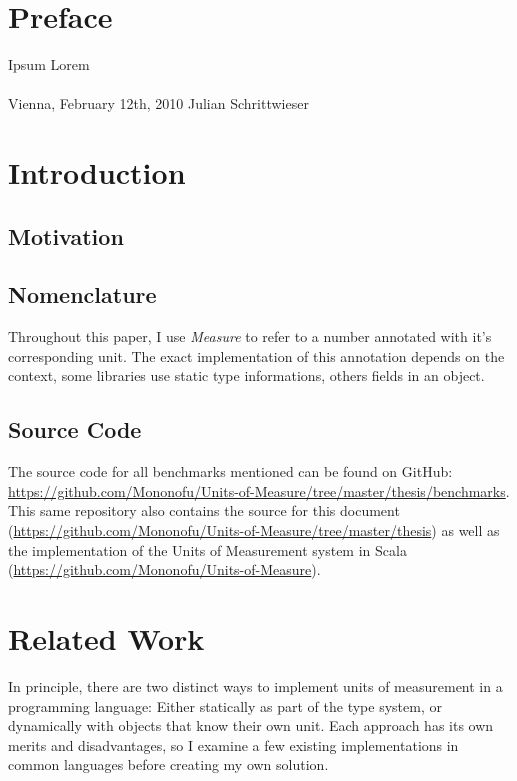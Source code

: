 \documentclass[12pt,oneside,a4paper]{scrbook}
\theoremstyle{definition}
\begin{document}
\chapter*{Preface}

Ipsum Lorem
\\ \\
Vienna, February 12th, 2010  \hfill Julian Schrittwieser

\singlespacing
\tableofcontents

\chapter{Introduction}
\setcounter{page}{1}
\section{Motivation}

\section{Nomenclature}
Throughout this paper, I use \emph{Measure} to refer to a number annotated with it's corresponding unit. The exact implementation of this annotation depends on the context, some libraries use static type informations, others fields in an object.

\section{Source Code}
The source code for all benchmarks mentioned can be found on GitHub: \url{https://github.com/Mononofu/Units-of-Measure/tree/master/thesis/benchmarks}. This same repository also contains the source for this document (\url{https://github.com/Mononofu/Units-of-Measure/tree/master/thesis}) as well as the implementation of the Units of Measurement system in Scala (\url{https://github.com/Mononofu/Units-of-Measure}).

\chapter{Related Work}

In principle, there are two distinct ways to implement units of measurement in a programming language: Either statically as part of the type system, or dynamically with objects that know their own unit. Each approach has its own merits and disadvantages, so I examine a few existing implementations in common languages before creating my own solution.
\end{document}
